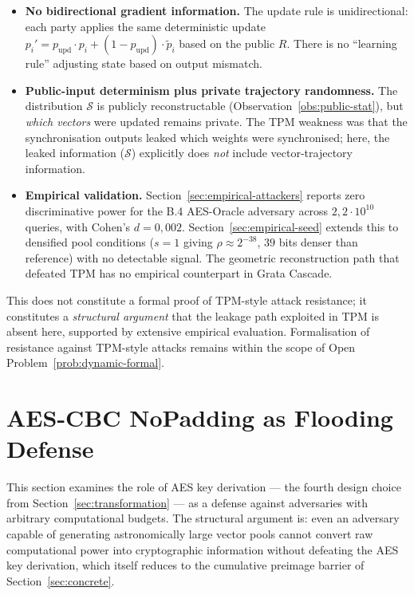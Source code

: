 \documentclass[11pt,a4paper]{article}
\begin{document}
\begin{itemize}[leftmargin=*]
\item \textbf{No bidirectional gradient information.} The update rule is unidirectional: each party applies the same deterministic update $p_i' = p_\text{upd} \cdot p_i + (1-p_\text{upd}) \cdot \tilde{p}_i$ based on the public $R$. There is no ``learning rule'' adjusting state based on output mismatch.
\item \textbf{Public-input determinism plus private trajectory randomness.} The distribution $\mathcal{S}$ is publicly reconstructable (Observation~\ref{obs:public-stat}), but \emph{which vectors} were updated remains private. The TPM weakness was that the synchronisation outputs leaked which weights were synchronised; here, the leaked information ($\mathcal{S}$) explicitly does \emph{not} include vector-trajectory information.
\item \textbf{Empirical validation.} Section~\ref{sec:empirical-attackers} reports zero discriminative power for the B.4 AES-Oracle adversary across $2{,}2 \cdot 10^{10}$ queries, with Cohen's $d = 0{,}002$. Section~\ref{sec:empirical-seed} extends this to densified pool conditions ($s = 1$ giving $\rho \approx 2^{-38}$, $39$ bits denser than reference) with no detectable signal. The geometric reconstruction path that defeated TPM has no empirical counterpart in Grata Cascade.
\end{itemize}

This does not constitute a formal proof of TPM-style attack resistance; it constitutes a \emph{structural argument} that the leakage path exploited in TPM is absent here, supported by extensive empirical evaluation. Formalisation of resistance against TPM-style attacks remains within the scope of Open Problem~\ref{prob:dynamic-formal}.

\section{AES-CBC NoPadding as Flooding Defense}\label{sec:aes}

This section examines the role of AES key derivation --- the fourth design choice from Section~\ref{sec:transformation} --- as a defense against adversaries with arbitrary computational budgets. The structural argument is: even an adversary capable of generating astronomically large vector pools cannot convert raw computational power into cryptographic information without defeating the AES key derivation, which itself reduces to the cumulative preimage barrier of Section~\ref{sec:concrete}.
\end{document}
